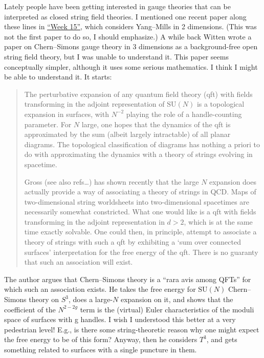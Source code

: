 \documentclass[12pt]{article}
\def\tightlist{}
\renewcommand{\texttt}[1]{%
  \begingroup
  \ttfamily
  \begingroup\lccode`~=`/\lowercase{\endgroup\def~}{/\discretionary{}{}{}}%
  \begingroup\lccode`~=`[\lowercase{\endgroup\def~}{[\discretionary{}{}{}}%
  \begingroup\lccode`~=`.\lowercase{\endgroup\def~}{.\discretionary{}{}{}}%
  \catcode`/=\active\catcode`[=\active\catcode`.=\active
  \scantokens{#1\noexpand}%
  \endgroup
}
\begin{document}
\noindent
Lately people have been getting interested in gauge theories that can be
interpreted as closed string field theories. I mentioned one recent
paper along these lines in \protect\hyperlink{week15}{``Week 15''},
which considers Yang--Mills in 2 dimensions. (This was not the first
paper to do so, I should emphasize.) A while back Witten wrote a paper
on Chern--Simons gauge theory in 3 dimensions as a background-free open
string field theory, but I was unable to understand it. This paper seems
conceptually simpler, although it uses some serious mathematics. I think
I might be able to understand it. It starts:

\begin{quote}
The perturbative expansion of any quantum field theory (qft) with fields
transforming in the adjoint representation of \(\mathrm{SU}(N)\) is a
topological expansion in surfaces, with \(N^{-2}\) playing the role of a
handle-counting parameter. For \(N\) large, one hopes that the dynamics
of the qft is approximated by the sum (albeit largely intractable) of
all planar diagrams. The topological classification of diagrams has
nothing a priori to do with approximating the dynamics with a theory of
strings evolving in spacetime.

Gross (see also refs\ldots) has shown recently that the large \(N\)
expansion does actually provide a way of associating a theory of strings
in QCD. Maps of two-dimensional string worldsheets into two-dimensional
spacetimes are necessarily somewhat constricted. What one would like is
a qft with fields transforming in the adjoint representation in
\(d > 2\), which is at the same time exactly solvable. One could then,
in principle, attempt to associate a theory of strings with such a qft
by exhibiting a `sum over connected surfaces' interpretation for the
free energy of the qft. There is no guaranty that such an association
will exist.
\end{quote}

The author argues that Chern--Simons theory is a ``rara avis among QFTs''
for which such an association exists. He takes the free energy for
\(\mathrm{SU}(N)\) Chern--Simons theory on \(S^3\), does a large-\(N\)
expansion on it, and shows that the coefficient of the \(N^{2-2g}\) term
is the (virtual) Euler characteristics of the moduli space of surfaces
with g handles. I wish I understood this better at a very pedestrian
level! E.g., is there some string-theoretic reason why one might expect
the free energy to be of this form? Anyway, then he considers \(T^3\),
and gets something related to surfaces with a single puncture in them.
\end{document}
